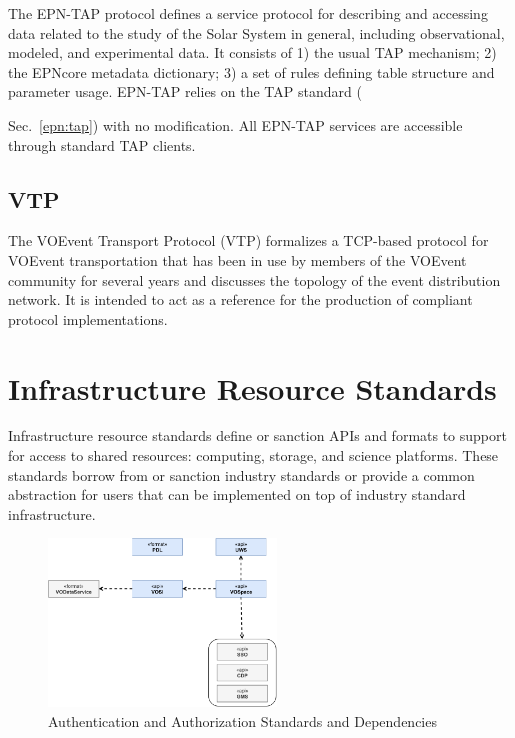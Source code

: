 \documentclass[11pt,letter]{ivoa}
\begin{document}
The EPN-TAP protocol \citep{2022ivoa.spec.0822E} defines a service
protocol for describing and accessing data related to the study of the
Solar System in general, including observational, modeled, and
experimental data. It consists of 1) the usual TAP mechanism; 2) the
EPNcore metadata dictionary; 3) a set of rules defining table structure
and parameter usage. EPN-TAP relies on the TAP standard
({Sec.~\ref{epn:tap}) with no modification. All EPN-TAP services are
accessible through standard TAP clients.


\subsection{VTP}

The VOEvent Transport Protocol (VTP) \citep{2017ivoa.spec.0320S}
formalizes a TCP-based protocol for VOEvent transportation
that has been in use by members of the VOEvent community for several
years and discusses
the topology of the event distribution network. It is intended to act as
a reference for
the production of compliant protocol implementations. 

\section{Infrastructure Resource Standards}
\label{gws}

Infrastructure resource standards define or sanction APIs and formats to
support for access
to shared resources: computing, storage, and science platforms. These
standards borrow from
or sanction industry standards or provide a common abstraction for users
that can be implemented
on top of industry standard infrastructure.

\begin{figure}[ht]
\centering
\includegraphics[width=0.54\textwidth]{ivoa-arch-gws.pdf}
\caption{Authentication and Authorization Standards and Dependencies}
\label{fig:gwsdeps}
\end{figure}

}
\end{document}
